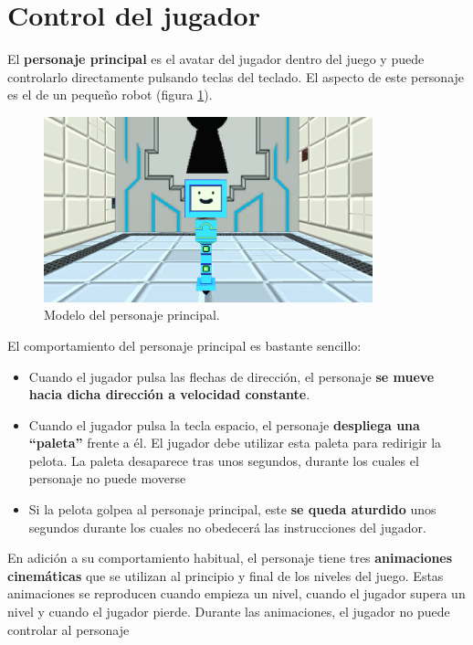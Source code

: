\section{Control del jugador}
El \textbf{personaje principal} es el avatar del jugador dentro del juego y puede controlarlo directamente pulsando teclas del teclado. El aspecto de este personaje es el de un pequeño robot (figura \ref{player_model}).
\begin{figure}[h]
	\includegraphics[width=0.85\textwidth]{images/estructura/personaje/flick_happy_small}
	\centering
	\caption{Modelo del personaje principal.}
	\label{player_model}
\end{figure}

El comportamiento del personaje principal es bastante sencillo: 
\begin{itemize}
\item Cuando el jugador pulsa las flechas de dirección, el personaje \textbf{se mueve hacia dicha dirección a velocidad constante}.
\item Cuando el jugador pulsa la tecla espacio, el personaje \textbf{despliega una ``paleta''} frente a él. El jugador debe utilizar esta paleta para redirigir la pelota. La paleta desaparece tras unos segundos, durante los cuales el personaje no puede moverse
\item Si la pelota golpea al personaje principal, este \textbf{se queda aturdido} unos segundos durante los cuales no obedecerá las instrucciones del jugador.
\end{itemize}
En adición a su comportamiento habitual, el personaje tiene tres \textbf{animaciones cinemáticas} que se utilizan al principio y final de los niveles del juego. Estas animaciones se reproducen cuando empieza un nivel, cuando el jugador supera un nivel y cuando el jugador pierde. Durante las animaciones, el jugador no puede controlar al personaje

